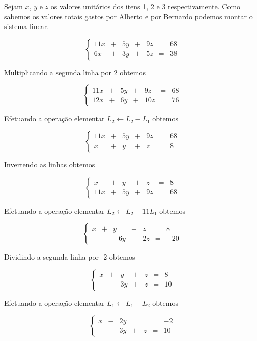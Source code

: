 \begin{solution}
Sejam $x$, $y$ e $z$ os valores unitários dos itens 1, 2 e 3 respectivamente. Como sabemos os valores totais gastos por Alberto e por Bernardo podemos montar o sistema linear.

$$\left\{\begin{array}{rrrrrrr}
 11x & + &   5y & + &  9z & = &  68\\
  6x & + &   3y & + &  5z & = &  38
\end{array} \right.$$

Multiplicando a segunda linha por 2 obtemos

$$\left\{\begin{array}{rrrrrrr}
 11x & + &   5y & + &   9z & = &  68\\
 12x & + &   6y & + &  10z & = &  76
\end{array} \right.$$

Efetuando a operação elementar $L_2 \leftarrow L_2 - L_1$ obtemos

$$\left\{\begin{array}{rrrrrrr}
 11x & + &   5y & + &   9z & = &  68\\
   x & + &    y & + &    z & = &   8
\end{array} \right.$$

Invertendo as linhas obtemos

$$\left\{\begin{array}{rrrrrrr}
   x & + &    y & + &    z & = &   8 \\
 11x & + &   5y & + &   9z & = &  68
\end{array} \right.$$

Efetuando a operação elementar $L_2 \leftarrow L_2 - 11L_1$ obtemos

$$\left\{\begin{array}{rrrrrrr}
   x & + &    y & + &    z & = &    8 \\
     &   &  -6y & - &   2z & = &  -20
\end{array} \right.$$

Dividindo a segunda linha por -2 obtemos

$$\left\{\begin{array}{rrrrrrr}
   x & + &    y & + &    z & = &    8 \\
     &   &   3y & + &    z & = &   10
\end{array} \right.$$

Efetuando a operação elementar $L_1 \leftarrow L_1 - L_2$ obtemos

$$\left\{\begin{array}{rrrrrrr}
   x & - &   2y &   &      & = &   -2 \\
     &   &   3y & + &    z & = &   10
\end{array} \right.$$


\end{solution}
